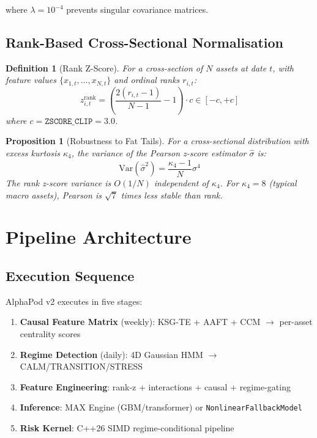\documentclass[12pt,a4paper]{article}
\newtheorem{proposition}[theorem]{Proposition}
\newtheorem{definition}[theorem]{Definition}
\begin{document}
where $\lambda = 10^{-4}$ prevents singular covariance matrices.

\subsection{Rank-Based Cross-Sectional Normalisation}

\begin{definition}[Rank Z-Score]
For a cross-section of $N$ assets at date $t$, with feature values $\{x_{1,t}, \ldots, x_{N,t}\}$
and ordinal ranks $r_{i,t}$:
\begin{equation}
    z_{i,t}^{\text{rank}} = \left(\frac{2(r_{i,t} - 1)}{N - 1} - 1\right) \cdot c
    \in [-c, +c]
\end{equation}
where $c = \texttt{ZSCORE\_CLIP} = 3.0$.
\end{definition}

\begin{proposition}[Robustness to Fat Tails]
For a cross-sectional distribution with excess kurtosis $\kappa_4$, the variance
of the Pearson z-score estimator $\hat{\sigma}$ is:
\begin{equation}
    \mathrm{Var}(\hat{\sigma}^2) = \frac{\kappa_4 - 1}{N}\sigma^4
\end{equation}
The rank z-score variance is $O(1/N)$ independent of $\kappa_4$. For $\kappa_4 = 8$
(typical macro assets), Pearson is $\sqrt{7}$ times less stable than rank.
\end{proposition}

\section{Pipeline Architecture}

\subsection{Execution Sequence}

AlphaPod v2 executes in five stages:
\begin{enumerate}
    \item \textbf{Causal Feature Matrix} (weekly): KSG-TE + AAFT + CCM $\to$
          per-asset centrality scores
    \item \textbf{Regime Detection} (daily): 4D Gaussian HMM $\to$ CALM/TRANSITION/STRESS
    \item \textbf{Feature Engineering}: rank-z + interactions + causal + regime-gating
    \item \textbf{Inference}: MAX Engine (GBM/transformer) or \texttt{NonlinearFallbackModel}
    \item \textbf{Risk Kernel}: C++26 SIMD regime-conditional pipeline
\end{enumerate}
\end{document}
